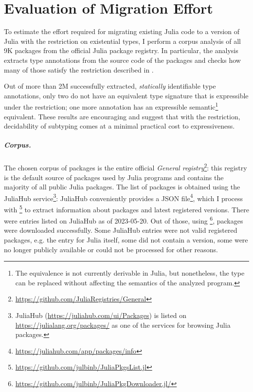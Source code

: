 \chapter{Evaluation of Migration Effort}\label{chap:eval}

To estimate the effort required for migrating existing Julia code
to a version of Julia with the restriction on existential types,
I perform a corpus analysis of all 9K packages
from the official Julia package registry.
In particular, the analysis extracts type annotations
from the source code of the packages
and checks how many of those satisfy the restriction
described in .

Out of more than 2M successfully extracted, \emph{statically} identifiable
type annotations, only two do not have an equivalent type signature
that is expressible under the restriction;
one more annotation has an expressible semantic\footnote{
  The equivalence is not currently derivable in Julia, but nonetheless,
  the type can be replaced without affecting the semantics of
  the analyzed program.} equivalent.
These results are encouraging and suggest that %
with the restriction, decidability of subtyping comes at a minimal practical
cost to expressiveness.

\paragraph{Corpus.}
The chosen corpus of packages is the entire official \emph{General
registry}\footnote{\url{https://github.com/JuliaRegistries/General}}:
this registry is the default source of packages used by Julia programs
and contains the majority of all public Julia packages.
The list of packages is obtained using
the JuliaHub service\footnote{
  JuliaHub (\url{https://juliahub.com/ui/Packages}) is listed on
  \url{https://julialang.org/packages/}
  as one of the services for browsing Julia packages.
}:
JuliaHub conveniently provides a JSON file\footnote{
  \url{https://juliahub.com/app/packages/info}
}, which I process with \footnote{
  \url{https://github.com/julbinb/JuliaPkgsList.jl}
} to extract information about packages and latest registered versions.
There were  entries listed on JuliaHub as of 2023-05-20.
Out of those, using \footnote{
  \url{https://github.com/julbinb/JuliaPkgDownloader.jl/}
},  packages were downloaded successfully.
Some JuliaHub entries were not valid registered packages,
e.g. the entry for Julia itself, some did not contain a version,
some were no longer publicly available or could not be processed
for other reasons.

